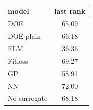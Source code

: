 \begin{tabular}{|lc|}
\hline
model & last rank\\
\hline
DOE & 65.09 \\
DOE plain & 66.18 \\
ELM & 36.36 \\
Fitloss & 69.27 \\
GP & 58.91 \\
NN & 72.00 \\
No surrogate & 68.18 \\
\hline
\end{tabular}
